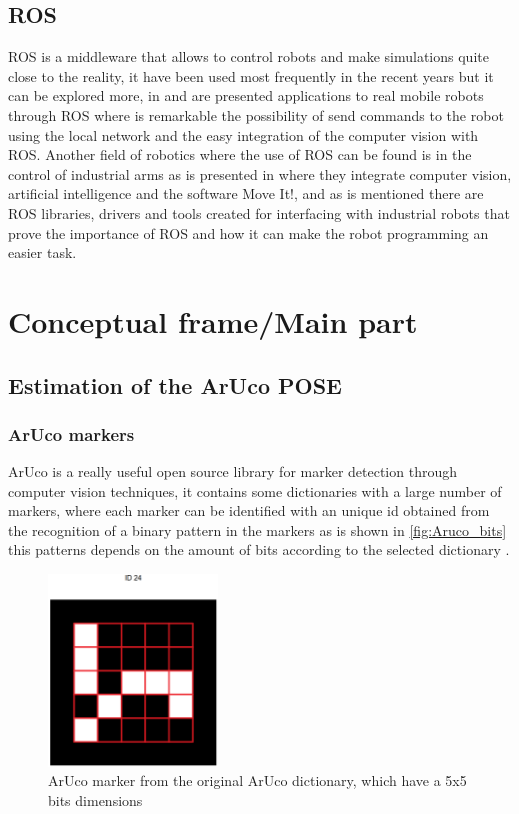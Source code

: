  
 
\section{ROS} 
 ROS is a middleware that allows to control robots and make simulations quite close to the reality, it have been used most frequently in the recent years but it can be explored more, in \citep{osio2018desenvolupament} and \citep{zhang2020robot} are presented applications to real mobile robots through ROS where is remarkable the possibility of send commands to the robot using the local network and the easy integration of the computer vision with ROS. Another field of robotics where the use of ROS can be found is in the control of industrial arms as is presented in \citep{arents2018integration} where they integrate computer vision, artificial intelligence and the software Move It!, and as is mentioned there are ROS libraries, drivers and tools created for interfacing with industrial robots that prove the importance of ROS and how it can make the robot programming an easier task.
 
 


\cleardoublepage
\chapter{Conceptual frame/Main part}
\section{Estimation of the ArUco POSE}
\subsection{ArUco markers}
ArUco is a really useful open source library for marker detection through computer vision techniques, it contains some dictionaries with a large number of markers, where each marker can be identified with an unique id obtained from the recognition of a binary pattern in the markers as is shown in \autoref{fig:Aruco_bits} this patterns depends on the amount of bits according to the selected dictionary \citep{salinas2019aruco}.

\begin{figure}[h!]
    \centering
 	\includegraphics[trim=0 0 0 0,clip,width=0.4\textwidth]{Figs/ArUco24.png}
    \caption{ArUco marker from the original ArUco dictionary, which have a 5x5 bits dimensions}
    \label{fig:Aruco_bits}
\end{figure}

